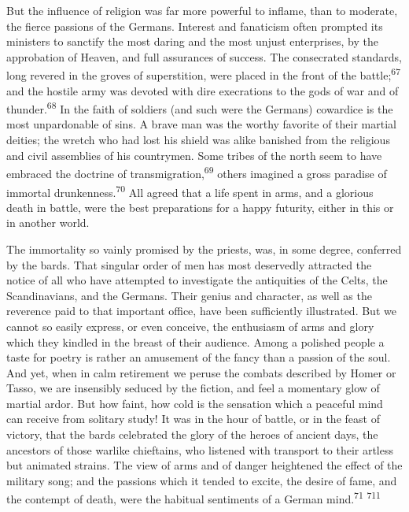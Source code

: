 But the influence of religion was far more powerful to inflame,
than to moderate, the fierce passions of the Germans. Interest
and fanaticism often prompted its ministers to sanctify the most
daring and the most unjust enterprises, by the approbation of
Heaven, and full assurances of success. The consecrated
standards, long revered in the groves of superstition, were
placed in the front of the battle;\textsuperscript{67} and the hostile army was
devoted with dire execrations to the gods of war and of thunder.\textsuperscript{68}
In the faith of soldiers (and such were the Germans) cowardice
is the most unpardonable of sins. A brave man was the worthy
favorite of their martial deities; the wretch who had lost his
shield was alike banished from the religious and civil assemblies
of his countrymen. Some tribes of the north seem to have embraced
the doctrine of transmigration,\textsuperscript{69} others imagined a gross
paradise of immortal drunkenness.\textsuperscript{70} All agreed that a life spent
in arms, and a glorious death in battle, were the best
preparations for a happy futurity, either in this or in another
world.





The immortality so vainly promised by the priests, was, in some
degree, conferred by the bards. That singular order of men has
most deservedly attracted the notice of all who have attempted to
investigate the antiquities of the Celts, the Scandinavians, and
the Germans. Their genius and character, as well as the reverence
paid to that important office, have been sufficiently
illustrated. But we cannot so easily express, or even conceive,
the enthusiasm of arms and glory which they kindled in the breast
of their audience. Among a polished people a taste for poetry is
rather an amusement of the fancy than a passion of the soul. And
yet, when in calm retirement we peruse the combats described by
Homer or Tasso, we are insensibly seduced by the fiction, and
feel a momentary glow of martial ardor. But how faint, how cold
is the sensation which a peaceful mind can receive from solitary
study! It was in the hour of battle, or in the feast of victory,
that the bards celebrated the glory of the heroes of ancient
days, the ancestors of those warlike chieftains, who listened
with transport to their artless but animated strains. The view of
arms and of danger heightened the effect of the military song;
and the passions which it tended to excite, the desire of fame,
and the contempt of death, were the habitual sentiments of a
German mind.\textsuperscript{71} \textsuperscript{711}

